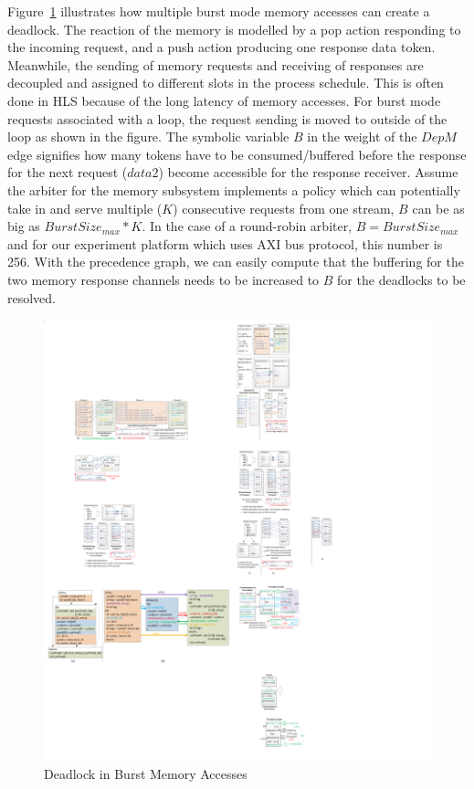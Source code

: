 \documentclass{sig-alternate}
\begin{document}
Figure~\ref{fig:memBurst} illustrates how multiple burst mode memory accesses can
create a deadlock. The reaction of the memory is modelled by a pop action
responding to the incoming request, and a push action producing one response data token. Meanwhile, the sending of memory requests and receiving of responses are decoupled and assigned to different slots in the process schedule. This is often done in HLS because of the long latency of memory accesses.
For burst mode requests associated with a loop, the request sending is moved to outside of the loop as shown in the figure. The symbolic variable $B$ in the weight of the $DepM$ edge signifies how many tokens have to be consumed/buffered before the response for the next request ($data2$) become accessible for the response receiver. Assume the arbiter for the memory subsystem implements a policy which can potentially take in and serve multiple ($K$) consecutive requests from one stream, $B$ can be as big as $BurstSize_{max}*K$. 
In the case of a round-robin arbiter, $B = BurstSize_{max}$ and for our experiment platform which uses AXI bus protocol, this number is 256. With the precedence graph, we can easily compute that the buffering for the two memory response channels needs to be increased to $B$ for the deadlocks to be resolved.
\begin{figure}[htp]
\begin{center}
\includegraphics[width=1.05\linewidth]{fig/burstMem.pdf}
\caption{Deadlock in Burst Memory Accesses
\label{fig:memBurst}}
\end{center}
\vspace{-3.0em}
\end{figure}
\end{document}
